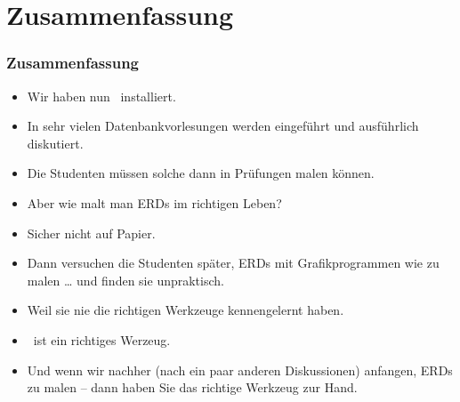 \documentclass[aspectratio=169,mathserif,notheorems]{beamer}%
\begin{document}
\section{Zusammenfassung}%
%
\begin{frame}%
\frametitle{Zusammenfassung}%
\begin{itemize}%
\item Wir haben nun \yEd\ installiert.%
\item<2-> In sehr vielen Datenbankvorlesungen werden  eingeführt und ausführlich diskutiert.%
\item<3-> Die Studenten müssen solche dann in Prüfungen malen können.%
\item<4-> Aber wie malt man ERDs im richtigen Leben?%
\item<5-> Sicher nicht auf Papier.%
\item<6-> Dann versuchen die Studenten später, ERDs mit Grafikprogrammen wie  zu malen {\dots} und finden sie unpraktisch.%
\item<7-> Weil sie nie die richtigen Werkzeuge kennengelernt haben.%
\item<8-> \yEd\ ist ein richtiges Werzeug.%
\item<9-> Und wenn wir nachher (nach ein paar anderen Diskussionen) anfangen, ERDs zu malen -- dann haben Sie das richtige Werkzeug zur Hand.%
\end{itemize}%
\end{frame}%
%
\endPresentation%
\end{document}

